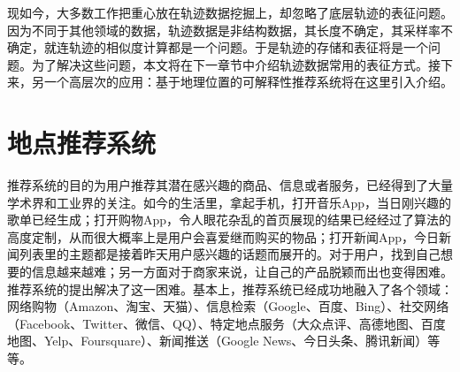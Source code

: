 现如今，大多数工作把重心放在轨迹数据挖掘上，却忽略了底层轨迹的表征问题。因为不同于其他领域的数据，轨迹数据是非结构数据，其长度不确定，其采样率不确定，就连轨迹的相似度计算都是一个问题。于是轨迹的存储和表征将是一个问题。为了解决这些问题，本文将在下一章节中介绍轨迹数据常用的表征方式。接下来，另一个高层次的应用：基于地理位置的可解释性推荐系统将在这里引入介绍。

\section{地点推荐系统}
推荐系统的目的为用户推荐其潜在感兴趣的商品、信息或者服务，已经得到了大量学术界和工业界的关注。如今的生活里，拿起手机，打开音乐App，当日刚兴趣的歌单已经生成；打开购物App，令人眼花杂乱的首页展现的结果已经经过了算法的高度定制，从而很大概率上是用户会喜爱继而购买的物品；打开新闻App，今日新闻列表里的主题都是接着昨天用户感兴趣的话题而展开的。对于用户，找到自己想要的信息越来越难；另一方面对于商家来说，让自己的产品脱颖而出也变得困难。推荐系统的提出解决了这一困难。基本上，推荐系统已经成功地融入了各个领域：网络购物（Amazon、淘宝、天猫）、信息检索（Google、百度、Bing）、社交网络（Facebook、Twitter、微信、QQ）、特定地点服务（大众点评、高德地图、百度地图、Yelp、Foursquare）、新闻推送（Google News、今日头条、腾讯新闻）等等。


